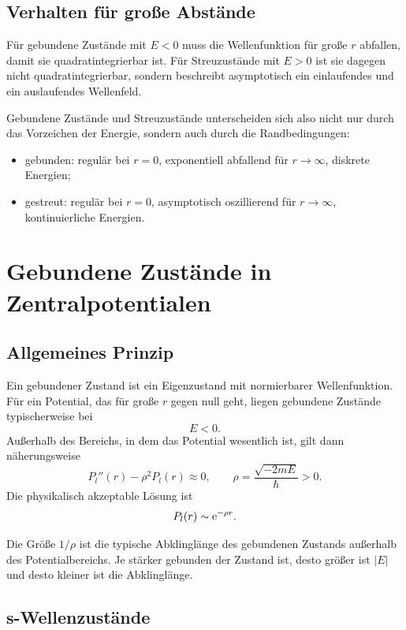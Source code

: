 \subsection{Verhalten für große Abstände}

Für gebundene Zustände mit \(E<0\) muss die Wellenfunktion für große \(r\) abfallen, damit sie quadratintegrierbar ist. Für Streuzustände mit \(E>0\) ist sie dagegen nicht quadratintegrierbar, sondern beschreibt asymptotisch ein einlaufendes und ein auslaufendes Wellenfeld.

\begin{conceptbox}
Gebundene Zustände und Streuzustände unterscheiden sich also nicht nur durch das Vorzeichen der Energie, sondern auch durch die Randbedingungen:
\begin{itemize}
    \item gebunden: regulär bei \(r=0\), exponentiell abfallend für \(r\to\infty\), diskrete Energien;
    \item gestreut: regulär bei \(r=0\), asymptotisch oszillierend für \(r\to\infty\), kontinuierliche Energien.
\end{itemize}
\end{conceptbox}

\section{Gebundene Zustände in Zentralpotentialen}

\subsection{Allgemeines Prinzip}

Ein gebundener Zustand ist ein Eigenzustand mit normierbarer Wellenfunktion. Für ein Potential, das für große \(r\) gegen null geht, liegen gebundene Zustände typischerweise bei
\[
    E<0.
\]
Außerhalb des Bereichs, in dem das Potential wesentlich ist, gilt dann näherungsweise
\[
    P_l''(r)-\rho^2P_l(r)\approx 0,
    \qquad
    \rho=\frac{\sqrt{-2mE}}{\hbar}>0.
\]
Die physikalisch akzeptable Lösung ist
\[
    P_l(r)\sim \mathrm{e}^{-\rho r}.
\]

\begin{notebox}
Die Größe \(1/\rho\) ist die typische Abklinglänge des gebundenen Zustands außerhalb des Potentialbereichs. Je stärker gebunden der Zustand ist, desto größer ist \(|E|\) und desto kleiner ist die Abklinglänge.
\end{notebox}

\subsection{s-Wellenzustände}

